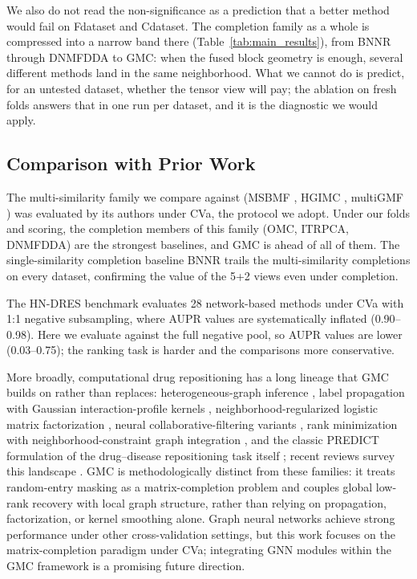 \documentclass[webpdf,modern,large]{oup-authoring-template}
\begin{document}
We also do not read the non-significance as a prediction that a better method would fail on Fdataset and Cdataset. The completion family as a whole is compressed into a narrow band there (Table~\ref{tab:main_results}), from BNNR through DNMFDDA to GMC: when the fused block geometry is enough, several different methods land in the same neighborhood. What we cannot do is predict, for an untested dataset, whether the tensor view will pay; the ablation on fresh folds answers that in one run per dataset, and it is the diagnostic we would apply.

\subsection{Comparison with Prior Work}

The multi-similarity family we compare against (MSBMF \citep{yang2020msbmf}, HGIMC \citep{yang2021hgimc}, multiGMF \citep{yang2026multigmf}) was evaluated by its authors under CVa, the protocol we adopt. Under our folds and scoring, the completion members of this family (OMC, ITRPCA, DNMFDDA) are the strongest baselines, and GMC is ahead of all of them. The single-similarity completion baseline BNNR trails the multi-similarity completions on every dataset, confirming the value of the 5+2 views even under completion.

The HN-DRES benchmark \citep{li2024hn_dres} evaluates 28 network-based methods under CVa with 1:1 negative subsampling, where AUPR values are systematically inflated (0.90--0.98). Here we evaluate against the full negative pool, so AUPR values are lower (0.03--0.75); the ranking task is harder and the comparisons more conservative.

More broadly, computational drug repositioning has a long lineage that GMC builds on rather than replaces: heterogeneous-graph inference \citep{wang2013}, label propagation with Gaussian interaction-profile kernels \citep{vanlaarhoven2011}, neighborhood-regularized logistic matrix factorization \citep{liu2016}, neural collaborative-filtering variants \citep{meng2022}, rank minimization with neighborhood-constraint graph integration \citep{liu2025tarm}, and the classic PREDICT formulation of the drug--disease repositioning task itself \citep{gottlieb2011}; recent reviews survey this landscape \citep{huang2025,reda2025}. GMC is methodologically distinct from these families: it treats random-entry masking as a matrix-completion problem and couples global low-rank recovery with local graph structure, rather than relying on propagation, factorization, or kernel smoothing alone. Graph neural networks achieve strong performance under other cross-validation settings, but this work focuses on the matrix-completion paradigm under CVa; integrating GNN modules within the GMC framework is a promising future direction.
\end{document}

